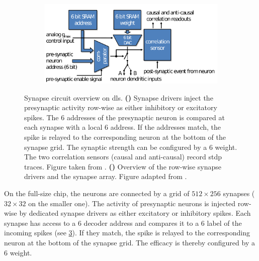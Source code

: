 \begin{figure}
	\begin{subfigure}[c]{0.7\textwidth}
		\centering
		\caption{}
		\includegraphics[width=\textwidth]{figures/synapse.png}
		\label{synapsecircuit}
	\end{subfigure}	
	\begin{subfigure}[c]{0.29\textwidth}
		\centering
		\caption{}
		
		\label{synapsearraysketch}
		\vspace{1cm}
	\end{subfigure}
	\caption[Synapse circuit overview on \gls{dls}]{Synapse circuit overview on \gls{dls}. \textbf{()} Synapse drivers inject the presynaptic activity row-wise as either inhibitory or excitatory spikes. The \SI{6}{\bit} addresses of the presynaptic neuron is compared at each synapse with a local \SI{6}{\bit} address. If the addresses match, the spike is relayed to the corresponding neuron at the bottom of the synapse grid. The synaptic strength can be configured by a \SI{6}{\bit} weight. The two correlation sensors (causal and anti-causal) record \gls{stdp} traces. Figure taken from \cite{friedmann2016hybridlearning}. \textbf{()} Overview of the row-wise synapse drivers and the synapse array. Figure adapted from \cite{billaudelle2019versatile}.}
	\label{synapseschematics}
\end{figure}

On the full-size chip, the neurons are connected by a grid of $512 \times 256$ synapses ($32 \times 32$ on the smaller one). The activity of presynaptic neurons is injected row-wise by dedicated synapse drivers as either excitatory or inhibitory spikes. Each synapse has access to a \SI{6}{\bit} decoder address and compares it to a \SI{6}{\bit} label of the incoming spikes (see \cref{synapseschematics}). If they match, the spike is relayed to the corresponding neuron at the bottom of the synapse grid. The efficacy is thereby configured by a \SI{6}{\bit} weight.

